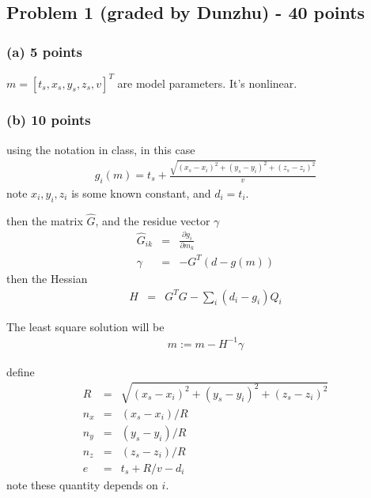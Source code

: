 \documentclass[11pt]{article}
\begin{document}
\lstset{language=Matlab,%
  breaklines=true,%
  morekeywords={matlab2tikz},
  keywordstyle=\color{blue},%
  morekeywords=[2]{1}, keywordstyle=[2]{\color{black}},
  identifierstyle=\color{black},%
  stringstyle=\color{mylilas},
  commentstyle=\color{mygreen},%
  showstringspaces=false,%
  numbers=left,%
  numberstyle={\tiny \color{black}},%
  numbersep=9pt, %
  emph=[1]{for,end,break},emphstyle=[1]\color{red}, %
}

\subsection*{Problem 1 (graded by Dunzhu) - 40 points}
\subsubsection*{(a) 5 points}
$m = [t_s, x_s, y_s, z_s, v]^T$ are model parameters. It's nonlinear.
\subsubsection*{(b) 10 points}

using the notation in class, in this case
\begin{eqnarray*}
g_i(m) = t_s + \frac{\sqrt{(x_s-x_i)^2 + (y_s-y_i)^2 + (z_s-z_i)^2} }{v}
\end{eqnarray*}
note $x_i,y_i,z_i$ is some known constant, and $d_i = t_i$. 

then the matrix $\hat{G}$, and the residue vector $\gamma$
\begin{eqnarray*}
\hat{G}_{ik} & = & \frac{\partial g_i}{\partial m_k}  \\
\gamma & = & - G^T(d - g(m))
\end{eqnarray*}
then the Hessian
\begin{eqnarray*}
H & = & G^T G - \sum_i (d_i - g_i) Q_i 
\end{eqnarray*}

The least square solution will be 
\begin{eqnarray*}
m := m - H^{-1} \gamma 
\end{eqnarray*}


define
\begin{eqnarray*}
  R   & = &\sqrt{(x_s-x_i)^2 + (y_s-y_i)^2 + (z_s-z_i)^2} \\
  n_x & = & (x_s-x_i)/R \\
  n_y & = & (y_s-y_i)/R \\
  n_z & = & (z_s-z_i)/R \\
  e   & = & t_s + R/v - d_i
\end{eqnarray*}
note these quantity depends on $i$.
\end{document}
